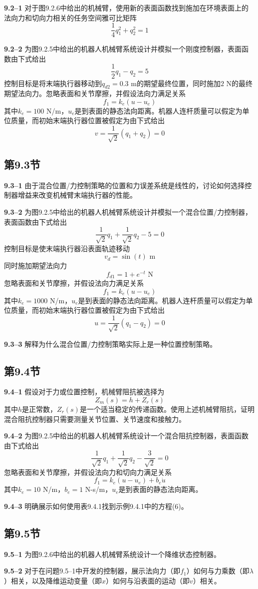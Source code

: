 \documentclass[12pt,a4paper]{ctexart}
\begin{document}
\textbf{9.2--1} 对于图9.2.6中给出的机械臂，使用新的表面函数找到施加在环境表面上的法向力和切向力相关的任务空间雅可比矩阵
\[
\frac{1}{4}q_1^2 + q_2^2 = 1
\]

\textbf{9.2--2} 为图9.2.5中给出的机器人机械臂系统设计并模拟一个刚度控制器，表面函数由下式给出
\[
\frac{1}{2}q_1 - q_2 = 5
\]
控制目标是将末端执行器移动到$q_{d2} = 0.3$ m的期望最终位置，同时施加$2$ N的最终期望法向力。忽略表面和关节摩擦，并假设法向力满足关系
\[
f_1 = k_e(u - u_e)
\]
其中$k_e = 100$ N/m，$u_e$是到表面的静态法向距离。机器人连杆质量可以假定为单位质量，而初始末端执行器位置被假定为由下式给出
\[
v = \frac{1}{\sqrt{2}}(q_1 + q_2) = 0
\]

\subsection*{第9.3节}

\textbf{9.3--1} 由于混合位置/力控制策略的位置和力误差系统是线性的，讨论如何选择控制器增益来改变机械臂末端执行器的性能。

\textbf{9.3--2} 为图9.2.5中给出的机器人机械臂系统设计并模拟一个混合位置/力控制器，表面函数由下式给出
\[
\frac{1}{\sqrt{2}}q_1 + \frac{1}{\sqrt{2}}q_2 - 5 = 0
\]
控制目标是使末端执行器沿表面轨迹移动
\[
v_d = \sin(t) \text{ m}
\]
同时施加期望法向力
\[
f_{d1} = 1 + e^{-t} \text{ N}
\]
忽略表面和关节摩擦，并假设法向力满足关系
\[
f_1 = k_e(u - u_e)
\]
其中$k_e = 1000$ N/m，$u_e$是到表面的静态法向距离。机器人连杆质量可以假定为单位质量，而初始末端执行器位置被假定为由下式给出
\[
u = \frac{1}{\sqrt{2}}(q_1 - q_2) = 0
\]

\textbf{9.3--3} 解释为什么混合位置/力控制策略实际上是一种位置控制策略。

\subsection*{第9.4节}

\textbf{9.4--1} 假设对于力或位置控制，机械臂阻抗被选择为
\[
Z_m(s) = h + Z_r(s)
\]
其中$h$是正常数，$Z_r(s)$是一个适当稳定的传递函数。使用上述机械臂阻抗，证明混合阻抗控制器只需要测量关节位置、关节速度和接触力。

\textbf{9.4--2} 为图9.2.5中给出的机器人机械臂系统设计一个混合阻抗控制器，表面函数由下式给出
\[
\frac{1}{\sqrt{2}}q_1 + \frac{1}{\sqrt{2}}q_2 - \frac{3}{\sqrt{2}} = 0
\]
忽略表面和关节摩擦，并假设法向力和切向力满足关系
\[
f_1 = k_e(u - u_e) + b_e \dot{u}
\]
其中$k_e = 10$ N/m，$b_e = 1$ N-s/m，$u_e$是到表面的静态法向距离。

\textbf{9.4--3} 明确展示如何使用表9.4.1找到示例9.4.1中的方程(6)。

\subsection*{第9.5节}

\textbf{9.5--1} 为图9.2.6中给出的机器人机械臂系统设计一个降维状态控制器。

\textbf{9.5--2} 对于在问题9.5--1中开发的控制器，展示法向力（即$f_1$）如何与力乘数（即$\lambda$）相关，以及降维运动变量（即$x$）如何与沿表面的运动（即$v$）相关。
\end{document}
